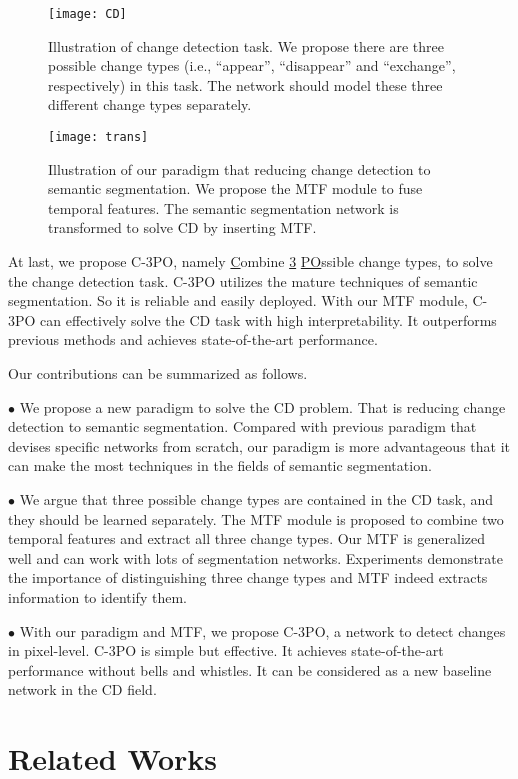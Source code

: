\documentclass[review]{elsarticle}
\begin{document}
\begin{figure}
	\centering
	\texttt{[image: CD]}
	\caption{Illustration of change detection task. We propose there are three possible change types (i.e., ``appear'', ``disappear'' and ``exchange'', respectively) in this task. The network should model these three different change types separately.}
	\label{fig:CD}
\end{figure}

\begin{figure}
	\centering
	\texttt{[image: trans]}
	\caption{Illustration of our paradigm that reducing change detection to semantic segmentation. We propose the MTF module to fuse temporal features. The semantic segmentation network is transformed to solve CD by inserting MTF.}
	\label{fig:Trans}
\end{figure}

At last, we propose C-3PO, namely \underline{C}ombine \underline{3} \underline{PO}ssible change types, to solve the change detection task. C-3PO utilizes the mature techniques of semantic segmentation. So it is reliable and easily deployed. With our MTF module, C-3PO can effectively solve the CD task with high interpretability. It outperforms previous methods and achieves state-of-the-art performance.

Our contributions can be summarized as follows.

$\bullet$ We propose a new paradigm to solve the CD problem. That is reducing change detection to semantic segmentation. Compared with previous paradigm that devises specific networks from scratch, our paradigm is more advantageous that it can make the most techniques in the fields of semantic segmentation.

$\bullet$ We argue that three possible change types are contained in the CD task, and they should be learned separately. The MTF module is proposed to combine two temporal features and extract all three change types. Our MTF is generalized well and can work with lots of segmentation networks. Experiments demonstrate the importance of distinguishing three change types and MTF indeed extracts information to identify them. 

$\bullet$ With our paradigm and MTF, we propose C-3PO, a network to detect changes in pixel-level. C-3PO is simple but effective. It achieves state-of-the-art performance without bells and whistles. It can be considered as a new baseline network in the CD field.

\section{Related Works}
\end{document}
